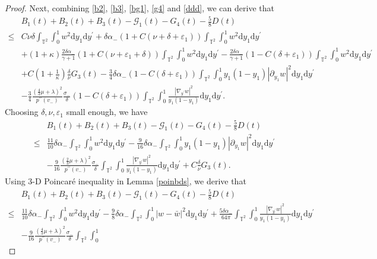 \documentclass[10pt,reqno]{amsart}
\numberwithin{equation}{section}
\newcommand{\dif}{\mathrm{d}}
\begin{document}
\begin{proof}
Next, combining \eqref{b2}, \eqref{b3}, \eqref{bg1}, \eqref{g4} and \eqref{ddd}, we can derive that
\begin{align*}
&B_1(t)+B_2(t)+B_3(t)-\mathcal{G}_1(t)-G_4(t)-\frac{5}{8}D(t)\\
\le &C\nu\delta\int_{\mathbb{T}^2}\int_0^1w^2\dif y_1\dif y^{\prime}
+\delta\alpha_-(1+C(\nu+\delta+\varepsilon_1))\int_{\mathbb{T}^2}\int_0^1
w^2\dif y_1\dif y^{\prime}\\
&+(1+\kappa)\frac{2\delta\alpha_-}{\gamma+1}(1+C(\nu+\varepsilon_1+\delta))\int_{\mathbb{T}^2}\int_0^1
w^2\dif y_1\dif y^{\prime}
-\frac{2\delta\alpha_-}{\gamma+1}(1-C(\delta+\varepsilon_1))\int_{\mathbb{T}^2}\int_0^1
w^2\dif y_1\dif y^{\prime}
\\
&
+C(1+\frac{1}{\kappa})\frac{\delta}{\nu}G_3(t)
-\frac{3}{4}\delta\alpha_-(1-C(\delta+\varepsilon_1))\int_{\mathbb{T}^2}\int_0^1y_1(1-y_1)|\partial_{y_1}w|^2
\dif y_1\dif y^{\prime}\\
& -\frac{3}{4}\frac{(\frac{4}{3}\mu+\lambda)^2}{p^{\prime\prime}(v_-)}\frac{\sigma_-}{\delta} (1-C(\delta+\varepsilon_1))\int_{\mathbb{T}^2}\int_0^1
\frac{|\nabla_{y^\prime}w|^2}{y_1(1-y_1)}
\dif y_1\dif y^{\prime}.
\end{align*}
Choosing $\delta, \nu, \varepsilon_1$ small enough, we have
\begin{align*}
&B_1(t)+B_2(t)+B_3(t)-\mathcal{G}_1(t)-G_4(t)-\frac{5}{8}D(t)\\
\le&
\frac{11}{10}\delta\alpha_-\int_{\mathbb{T}^2}\int_0^1
w^2\dif y_1\dif y^{\prime}
-\frac{9}{16}\delta\alpha_-\int_{\mathbb{T}^2}\int_0^1y_1(1-y_1)|\partial_{y_1}w|^2
\dif y_1\dif y^{\prime}\\
& -\frac{9}{16}\frac{(\frac{2}{3}\mu+\lambda)^2}{p^{\prime\prime}(v_-)}\frac{\sigma_-}{\delta} \int_{\mathbb{T}^2}\int_0^1
\frac{|\nabla_{y^\prime}w|^2}{y_1(1-y_1)}
\dif y_1\dif y^{\prime}
+C\frac{\delta}{\nu}G_3(t).
\end{align*}
Using 3-D Poincar\'e inequality in Lemma \ref{poinbds}, we derive that
\begin{align*}
&B_1(t)+B_2(t)+B_3(t)-\mathcal{G}_1(t)-G_4(t)-\frac{5}{8}D(t)\\
\le&
\frac{11}{10}\delta\alpha_-\int_{\mathbb{T}^2}\int_0^1
w^2\dif y_1\dif y^{\prime}
-\frac{9}{8}\delta\alpha_-\int_{\mathbb{T}^2}\int_0^1|w-\bar w|^2
\dif y_1\dif y^{\prime}
+\frac{5\delta\alpha_-}{64\pi}\int_{\mathbb{T}^2}\int_0^1
\frac{|\nabla_{y^\prime}w|^2}{y_1(1-y_1)}
\dif y_1\dif y^{\prime}\\
&-\frac{9}{16}\frac{(\frac{4}{3}\mu+\lambda)^2}{p^{\prime\prime}(v_-)}\frac{\sigma_-}{\delta} \int_{\mathbb{T}^2}\int_0^1

\end{align*}
\end{proof}
\end{document}
